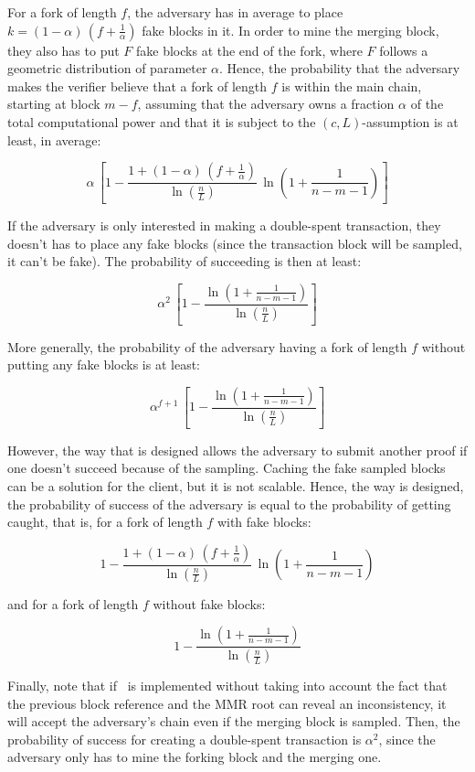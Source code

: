         For a fork of length \(f\), the adversary has in average to place \(k=(1-\alpha)\,\left(f+\frac{1}{\alpha}\right)\) fake blocks in it. In order to mine the merging block, they also has to put \(F\) fake blocks at the end of the fork, where \(F\) follows a geometric distribution of parameter \(\alpha\). Hence, the probability that the adversary makes the verifier believe that a fork of length \(f\) is within the main chain, starting at block \(m-f\), assuming that the adversary owns a fraction \(\alpha\) of the total computational power and that it is subject to the \((c,L)\)-assumption is at least, in average:
        
        \[\alpha\,\left[1-\frac{1+(1-\alpha)\,\left(f+\frac1\alpha\right)}{\ln\left(\frac{n}{L}\right)}\,\ln\left(1+\frac{1}{n-m-1}\right)\right]\]
        
        If the adversary is only interested in making a double-spent transaction, they doesn't has to place any fake blocks (since the transaction block will be sampled, it can't be fake). The probability of succeeding is then at least:
        
        \[\alpha^2\,\left[1-\frac{\ln\left(1+\frac{1}{n-m-1}\right)}{\ln\left(\frac{n}{L}\right)}\right]\]
        
        More generally, the probability of the adversary having a fork of length \(f\) without putting any fake blocks is at least:
        
        \[\alpha^{f+1}\,\left[1-\frac{\ln\left(1+\frac{1}{n-m-1}\right)}{\ln\left(\frac{n}{L}\right)}\right]\]
        
        However, the way that \FC is designed allows the adversary to submit another proof if one doesn't succeed because of the sampling. Caching the fake sampled blocks can be a solution for the client, but it is not scalable. Hence, the way \FC is designed, the probability of success of the adversary is equal to the probability of getting caught, that is, for a fork of length \(f\) with fake blocks:
        
        \[1-\frac{1+(1-\alpha)\,\left(f+\frac1\alpha\right)}{\ln\left(\frac{n}{L}\right)}\,\ln\left(1+\frac{1}{n-m-1}\right)\]
        
        and for a fork of length \(f\) without fake blocks:
        
        \[1-\frac{\ln\left(1+\frac{1}{n-m-1}\right)}{\ln\left(\frac{n}{L}\right)}\]
        
        Finally, note that if \FC\ is implemented without taking into account the fact that the previous block reference and the MMR root can reveal an inconsistency, it will accept the adversary's chain even if the merging block is sampled. Then, the probability of success for creating a double-spent transaction is \(\alpha^2\), since the adversary only has to mine the forking block and the merging one.
